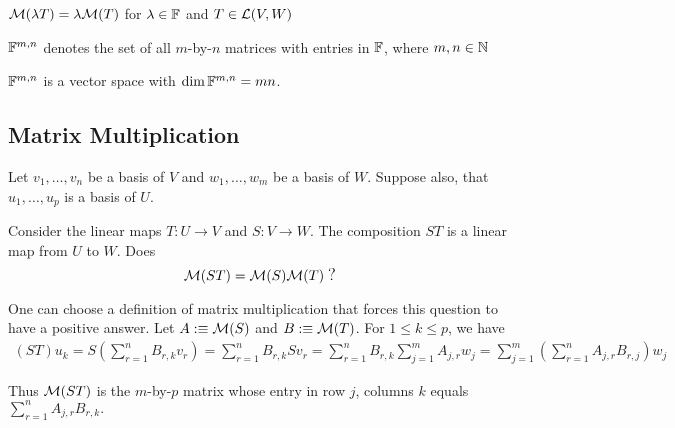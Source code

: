 \setcounter{thm}{37}
\begin{thm}
  $\mathcal{M}(\lambda T) = \lambda \mathcal{M}(T)$ for $\lambda \in \mathbb{F}$ and $T \in \mathcal{L} (V,W)$
\end{thm}

\begin{mydef} 
  $\mathbb{F}^{m,n}$ denotes the set of all $m$-by-$n$ matrices with entries in $\mathbb{F}$, where $m,n \in \mathbb{N}$
\end{mydef}

\begin{thm} %
  \label{thm: the dimension of the vector space of all m by n matrices is mn}
  $\mathbb{F}^{m,n}$ is a vector space with $\dim \mathbb{F}^{m,n}=mn$.
\end{thm}


\subsection{Matrix Multiplication}

Let $v_1, \ldots, v_n$ be a basis of $V$ and $w_1, \ldots, w_m$ be a basis of $W.$ Suppose also, that $u_1, \ldots, u_p$ is a basis of $U$.

Consider the linear maps $T: U \to V$ and $S: V \to W$. The composition $ST$ is a linear map from $U$ to $W$. Does
\begin{equation}
  \mmatrix(ST) = \mmatrix(S) \mmatrix(T) \; {\mathlarger ?}
\end{equation}

One can choose a definition of matrix multiplication that forces this question to have a positive answer. Let $A :\equiv \mathcal{M}(S)$ and $B :\equiv \mathcal{M}(T)$. For $1 \leq k \leq p$, we have
\begin{equation}
  \begin{aligned}
    (ST) u_k 
    = S \left ( \sum_{r=1}^{n} B_{r,k} v_r \right )
    =  \sum_{r=1}^{n} B_{r,k} S v_r 
    =  \sum_{r=1}^{n} B_{r,k} \sum_{j=1}^{m} A_{j,r}  w_j 
    =  \sum_{j=1}^{m} \left( \sum_{r=1}^{n} A_{j,r}  B_{r,j} \right) w_j 
  \end{aligned}
\end{equation}

Thus $\mathcal{M}(ST)$ is the $m$-by-$p$ matrix whose entry in row $j$, columns $k$ equals 
  $\sum_{r=1}^{n} A_{j,r}  B_{r,k}.$


